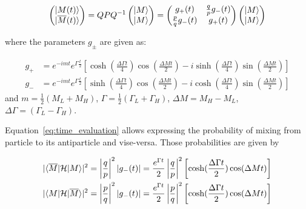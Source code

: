 \begin{align}
\label{eq:time_evaluation}
  \left(\begin{matrix} \lvert M(t)\rangle  \\ \lvert\overline{M}(t)\rangle \end{matrix}  \right) 
  = QPQ^{-1} \left(\begin{matrix} \lvert M\rangle  \\ \lvert M\rangle \end{matrix}  \right) 
  = \left(\begin{matrix} g_{+}(t) &  \frac{q}{p}g_{-}(t)  \\  \frac{p}{q}g_{-}(t)  & g_{+}(t)  \end{matrix}\right) 
  \left(\begin{matrix} \lvert M\rangle  \\ \lvert M\rangle \end{matrix}  \right)   
\end{align}

where the parameters $g_{\pm}$ are given as:

\begin{align}
    g_{+} &= e^{-imt}e^{\Gamma \frac{t}{2}} \left[ \cosh(\frac{\Delta \Gamma t}{4})\cos(\frac{\Delta M t}{2})  - i\sinh(\frac{\Delta \Gamma t}{4})\sin(\frac{\Delta M t}{2})  \right] \\ 
    g_{-} &= e^{-imt}e^{\Gamma \frac{t}{2}} \left[ \sinh(\frac{\Delta \Gamma t}{4})\cos(\frac{\Delta M t}{2})  - i\cosh(\frac{\Delta \Gamma t}{4})\sin(\frac{\Delta M t}{2})  \right]   
\end{align}
and $m = \frac{1}{2}(M_{L}+M_H)$, $\Gamma =  \frac{1}{2}(\Gamma_{L}+\Gamma_{H})$, $\Delta M = M_{H}- M_{L}$, $ \Delta \Gamma =(\Gamma_{L}-\Gamma_{H})$.

Equation~\ref{eq:time_evaluation} allows expressing the probability of mixing from particle to its antiparticle and vise-versa. Those probabilities are given by 

\begin{align}
\label{eq:mixing_prob}
|\langle\overline{M}\rvert \mathcal{H} \lvert M\rangle|^{2} = \left|\frac{q}{p}\right|^{2} |g_{-}(t)| = \frac{e^{\Gamma t}}{2} \left|\frac{q}{p}\right|^{2}  \left[ \cosh(\frac{\Delta \Gamma t}{2})\cos(\Delta M t) \right] \\ 
|\langle M\rvert \mathcal{H} \lvert\overline{M}\rangle|^{2} = \left|\frac{p}{q}\right|^{2} |g_{-}(t)| = \frac{e^{\Gamma t}}{2} \left|\frac{p}{q}\right|^{2}  \left[ \cosh(\frac{\Delta \Gamma t}{2})\cos(\Delta M t) \right]
\end{align}

